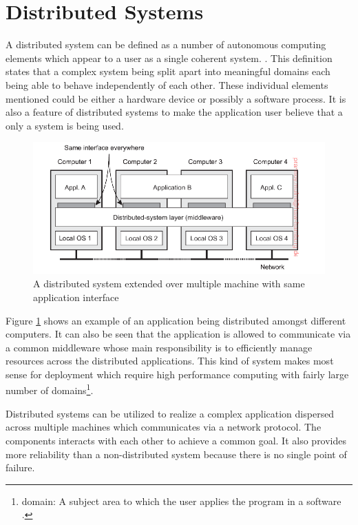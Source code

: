 \section{Distributed Systems}

    A distributed system can be defined as a number of autonomous computing elements which 
    appear to a user as a single coherent system. \cite[p.~2]{DistributedSystems}. 
    This definition states that a complex system being split apart into meaningful domains
    each being able to behave independently of each other. These individual elements 
    mentioned could be either a hardware device or possibly a software process. It is also 
    a feature of distributed systems to make the application user believe that a only a system 
    is being used. 

    \begin{figure}[htbp!]
        \centering \includegraphics[scale=0.94]{grafiken/distributedSystem.png}
        \caption{A distributed system extended over multiple machine with same application 
        interface \cite[p.~5]{DistributedSystems}}
        \label{fig:distributedSystem}
    \end{figure}

    \newpage
    \par
        Figure \ref{fig:distributedSystem} shows an example of an application being 
        distributed amongst different computers. It can also be seen that the application
        is allowed to communicate via a common middleware whose main responsibility is to
        efficiently manage resources across the distributed applications. This kind of system
        makes most sense for deployment which require high performance computing with fairly
        large number of domains\footnote{domain: A subject area to which the user applies the program in a 
        software \cite{DDD}.}.

    \par
        Distributed systems can be utilized to realize a complex application dispersed across
        multiple machines which communicates via a network protocol. The 
        components interacts with each other to achieve a common goal. It also provides
        more reliability than a non-distributed system because there is no single point
        of failure. 


